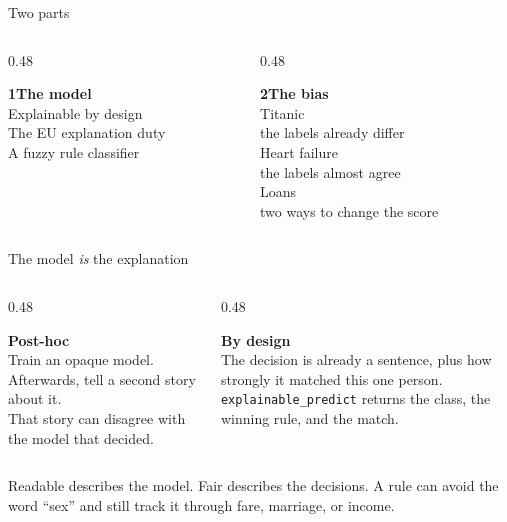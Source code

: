 \documentclass[aspectratio=169,11pt]{beamer}
\newcommand{\hilite}[1]{\textcolor{ebdnavy}{\textit{#1}}}
\begin{document}
\begin{frame}{Two parts}
  \begin{columns}[T]
    \begin{column}{0.48\textwidth}
      \colorbox{ebdcard}{\parbox[t]{0.92\textwidth}{%
        {\color{ebdnavy}\large\bfseries 1\quad The model}\\[0.45em]
        Explainable by design\\[0.25em]
        The EU explanation duty\\[0.25em]
        A fuzzy rule classifier}}
    \end{column}
    \begin{column}{0.48\textwidth}
      \colorbox{ebdcard}{\parbox[t]{0.92\textwidth}{%
        {\color{ebdgreen}\large\bfseries 2\quad The bias}\\[0.45em]
        Titanic\\
        the labels already differ\\[0.3em]
        Heart failure\\
        the labels almost agree\\[0.3em]
        Loans\\
        two ways to change the score}}
    \end{column}
  \end{columns}
\end{frame}

\begin{frame}{The model \hilite{is} the explanation}
  \begin{columns}[T]
    \begin{column}{0.48\textwidth}
      \colorbox{ebdcard}{\parbox[t]{0.92\textwidth}{%
        {\color{ebdnavy}\textbf{Post-hoc}}\\[0.4em]
        Train an opaque model.\\
        Afterwards, tell a second story about it.\\[0.45em]
        {\small\color{ebdmuted}That story can disagree with the model that decided.}}}
    \end{column}
    \begin{column}{0.48\textwidth}
      \colorbox{ebdsage}{\parbox[t]{0.92\textwidth}{%
        {\color{ebdgreen}\textbf{By design}}\\[0.4em]
        The decision is already a sentence, plus how strongly it matched this one person.\\[0.45em]
        {\small\texttt{explainable\_predict} returns the class, the winning rule, and the match.}}}
    \end{column}
  \end{columns}
  \vspace{0.7em}
  {\small Readable describes the model. Fair describes the decisions. A rule can avoid the word ``sex'' and still track it through fare, marriage, or income.}
\end{frame}
\end{document}
